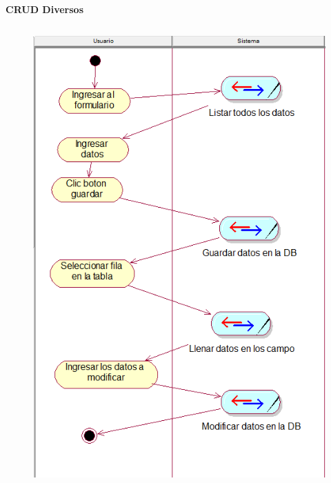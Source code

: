 \documentclass[12pt]{report}
\begin{document}
\vspace{\baselineskip}

\vspace{\baselineskip}

\vspace{\baselineskip}



\newpage

\vspace{\baselineskip}\textbf{CRUD Diversos}\par




\begin{figure}[H]
	\begin{Center}
		\includegraphics[width=4.62in,height=6.97in]{./media/image5.png}
	\end{Center}
\end{figure}
\end{document}
